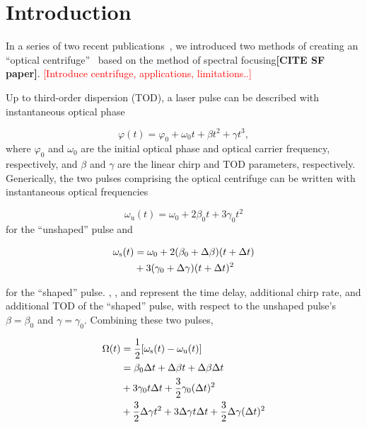 \section{Introduction}
\label{sec:Introduction}
In a series of two recent publications~\cite{Optical-centrifuge-with2025,An-ultraslow-optical-centrifuge2025}, we introduced two methods of creating an ``optical centrifuge''~\cite{Optical-Centrifuge-for-Molecules1999} based on the method of spectral focusing\textbf{[CITE SF paper]}.   \textcolor{red}{[Introduce centrifuge, applications, limitations..]}


Up to third-order dispersion (TOD), a laser pulse can be described with instantaneous optical phase

\begin{equation}
    \label{Eq:phase}
\varphi(t) = \varphi_0 + \omega_0 t + \beta t^2 + \gamma t^3,
\end{equation}
\noindent where $\varphi_0$ and $\omega_0$ are the initial optical phase and optical carrier frequency, respectively, and $\beta$ and $\gamma$ are the linear chirp and TOD parameters, respectively. Generically, the two pulses comprising the optical centrifuge can be written with instantaneous optical frequencies 

\begin{equation}
\omega_\mathrm{u}(t) = \omega_0 + 2\beta_0 t + 3 \gamma_0 t^2 
\end{equation}
\noindent for the ``unshaped'' pulse and

\begin{align}
\omega_\mathrm{s}(t) &= \omega_0 + 2(\beta_0 + \Delta\beta)(t + \Delta t) \\
&+ 3 (\gamma _0 + \Delta\gamma)(t + \Delta t)^2 
\end{align}

\noindent for the ``shaped'' pulse. \dt{}, \db{}, and \dg{} represent the time delay, additional chirp rate, and additional TOD of the ``shaped'' pulse, with respect to the unshaped pulse's $\beta = \beta_0$ and $\gamma = \gamma_0$. Combining these two pulses,

\begin{align}
\label{Eq:CFG}
\begin{split}
\Omega (t) &= \frac{1}{2}[\omega_\mathrm{s}(t)  - \omega_\mathrm{u}(t) ]\\
&= \beta_0 \Delta t + \Delta\beta t + \Delta\beta \Delta t \\
&+ 3 \gamma_0 t \Delta t + \frac{3}{2} \gamma_0 (\Delta t)^2 \\
&+ \frac{3}{2} \Delta\gamma t^2 + 3 \Delta\gamma t \Delta t + \frac{3}{2} \Delta\gamma (\Delta t)^2
\end{split}
\end{align}

